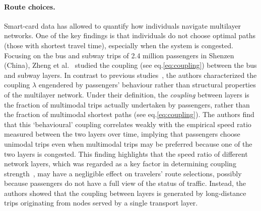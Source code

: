 \paragraph{Route choices.} 
Smart-card data has allowed to quantify how individuals navigate multilayer networks. One of the key findings is that individuals do not choose optimal paths (those with shortest travel time), especially when the system is congested. Focusing on the bus and subway trips of 2.4 million passengers in Shenzen (China), Zheng et al.~\cite{zheng2018coupling} studied the coupling (see eq.\ref{eq:coupling}) between the bus and subway layers. In contrast to previous studies~\cite{strano2015features}, the authors characterized the coupling $\lambda$ engendered by passengers' behaviour rather than structural properties of the multilayer network. Under their definition, the \emph{coupling} between layers is the fraction of multimodal trips actually undertaken by passengers, rather than the fraction of multimodal shortest paths (see eq.\ref{eq:coupling}). The authors find that this `behavioural' coupling correlates weakly with the empirical speed ratio measured between the two layers over time, implying that passengers choose unimodal trips even when multimodal trips may be preferred because one of the two layers is congested. This finding highlights that the speed ratio of different network layers, which was regarded as a key factor in determining coupling strength~\cite{strano2015features,chodrow2016congestion}, may have a negligible effect on travelers’ route selections, possibly because passengers do not have a full view of the status of traffic. Instead, the authors showed that the coupling between layers is generated by long-distance trips originating from nodes served by a single transport layer.

